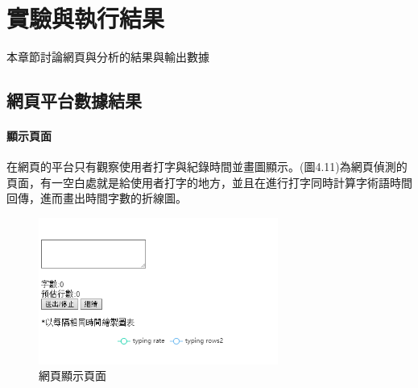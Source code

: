 \chapter{實驗與執行結果}
\label{c:intro}
本章節討論網頁與分析的結果與輸出數據
\section{網頁平台數據結果}
\subsubsection{顯示頁面}
在網頁的平台只有觀察使用者打字與紀錄時間並畫圖顯示。(圖4.11)為網頁偵測的頁面，有一空白處就是給使用者打字的地方，並且在進行打字同時計算字術語時間回傳，進而畫出時間字數的折線圖。
	\begin{figure}[H] 
	\centering 
	\includegraphics[width=0.7\textwidth]{4_1.png} 
	\caption{網頁顯示頁面} 
	\label{Fig.4.1} 
	\end{figure}
